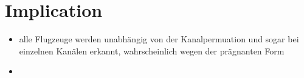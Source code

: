 \section*{Implication}
\begin{itemize}
    \item alle Flugzeuge werden unabhängig von der Kanalpermuation und sogar bei einzelnen Kanälen erkannt, wahrscheinlich wegen der prägnanten Form 
    \item 
\end{itemize}

